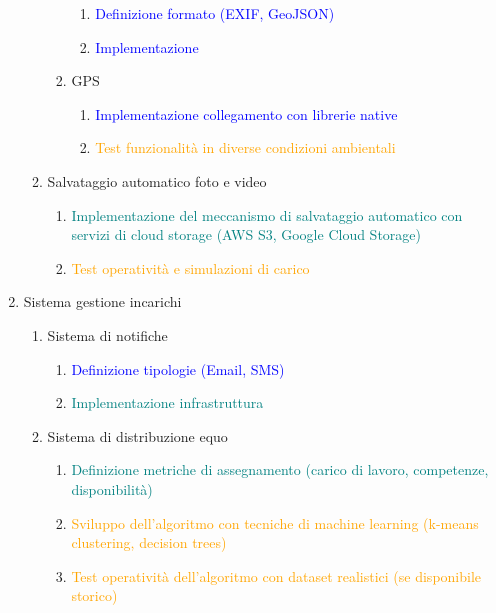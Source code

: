 \documentclass[a4paper,12pt, openright]{report}
\begin{document}
\begin{enumerate}
\begin{enumerate}
\begin{enumerate}
\begin{enumerate}
                \item \textcolor{blue}{Definizione formato (EXIF, GeoJSON)}
                \item \textcolor{blue}{Implementazione}
            \end{enumerate}
            \item GPS
            \begin{enumerate}
                \item \textcolor{blue}{Implementazione collegamento con librerie native}
                \item \textcolor{orange}{Test funzionalità in diverse condizioni ambientali}
            \end{enumerate}
        \end{enumerate}
        \item Salvataggio automatico foto e video
        \begin{enumerate}
            \item \textcolor{teal}{Implementazione del meccanismo di salvataggio automatico con servizi di cloud storage (AWS S3, Google Cloud Storage)}
            \item \textcolor{orange}{Test operatività e simulazioni di carico}
        \end{enumerate}
    \end{enumerate}
    \item Sistema gestione incarichi
    \begin{enumerate}
        \item Sistema di notifiche
        \begin{enumerate}
            \item \textcolor{blue}{Definizione tipologie (Email, SMS)}
            \item \textcolor{teal}{Implementazione infrastruttura}
        \end{enumerate}
        \item Sistema di distribuzione equo
        \begin{enumerate}
            \item \textcolor{teal}{Definizione metriche di assegnamento (carico di lavoro, competenze, disponibilità)}
            \item \textcolor{orange}{Sviluppo dell'algoritmo con tecniche di machine learning (k-means clustering, decision trees)}
            \item \textcolor{orange}{Test operatività dell'algoritmo con dataset realistici (se disponibile storico)}
        \end{enumerate}

\end{enumerate}
\end{enumerate}
\end{document}
